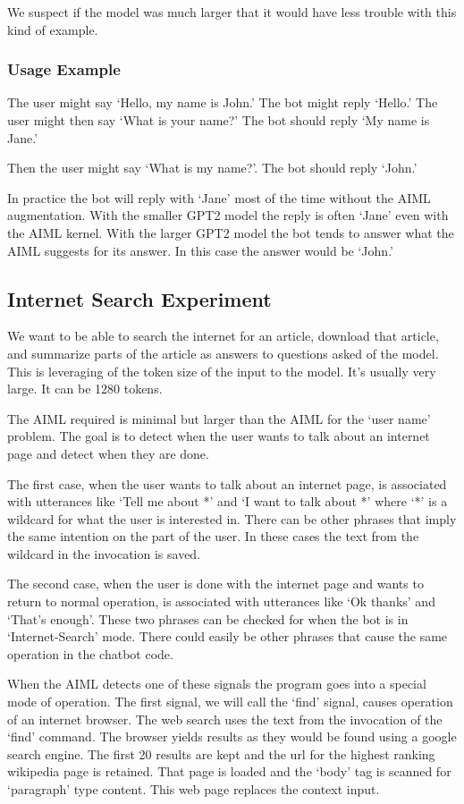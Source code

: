 We suspect if the model was much larger that it would have less trouble with this kind of example.

\subsubsection{Usage Example}

The user might say `Hello, my name is John.' The bot might reply `Hello.' The user might then say `What is your name?' The bot should reply `My name is Jane.'

Then the user might say `What is my name?'. The bot should reply `John.'

In practice the bot will reply with `Jane' most of the time without the AIML augmentation. With the smaller GPT2 model the reply is often `Jane' even with the AIML kernel. With the larger GPT2 model the bot tends to answer what the AIML suggests for its answer. In this case the answer would be `John.'

\subsection{Internet Search Experiment}

We want to be able to search the internet for an article, download that article, and summarize parts of the article as answers to questions asked of the model. This is leveraging of the token size of the input to the model. It's usually very large. It can be 1280 tokens.

The AIML required is minimal but larger than the AIML for the `user name' problem. The goal is to detect when the user wants to talk about an internet page and detect when they are done.

The first case, when the user wants to talk about an internet page, is associated with utterances like `Tell me about *' and `I want to talk about *' where `*' is a wildcard for what the user is interested in. There can be other phrases that imply the same intention on the part of the user. In these cases the text from the wildcard in the invocation is saved.

The second case, when the user is done with the internet page and wants to return to normal operation, is associated with utterances like `Ok thanks' and `That's enough'. These two phrases can be checked for when the bot is in `Internet-Search' mode. There could easily be other phrases that cause the same operation in the chatbot code.

When the AIML detects one of these signals the program goes into a special mode of operation. The first signal, we will call the `find' signal, causes operation of an internet browser. The web search uses the text from the invocation of the `find' command. The browser yields results as they would be found using a google search engine. The first 20 results are kept and the url for the highest ranking wikipedia page is retained. That page is loaded and the `body' tag is scanned for `paragraph' type content. This web page replaces the context input. 

